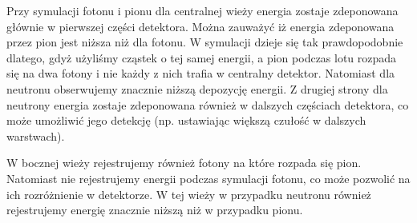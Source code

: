 \documentclass[11pt]{article}
\begin{document}
Przy symulacji fotonu i pionu dla centralnej wieży energia zostaje zdeponowana głównie w pierwszej części detektora. 
Można zauważyć iż energia zdeponowana przez pion jest niższa niż dla fotonu. W symulacji dzieje się tak 
prawdopodobnie dlatego, gdyż użyliśmy cząstek o tej samej energii, a pion podczas lotu rozpada się na dwa fotony i nie każdy z nich trafia w centralny detektor.
 Natomiast dla neutronu obserwujemy znacznie niższą depozycję energii. 
 Z drugiej strony dla neutrony energia zostaje zdeponowana również w dalszych częściach detektora, co może umożliwić jego detekcję 
(np. ustawiając większą czułość w dalszych warstwach). 

W bocznej wieży rejestrujemy również fotony na które rozpada się pion. Natomiast nie rejestrujemy energii podczas symulacji fotonu, co może pozwolić 
na ich rozróżnienie w detektorze. W tej wieży w przypadku neutronu również rejestrujemy energię znacznie niższą niż w przypadku pionu.
\end{document}
